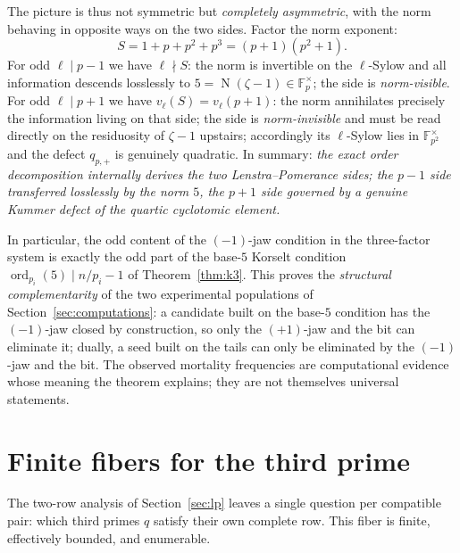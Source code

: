 \documentclass[11pt]{amsart}
\theoremstyle{definition}
\theoremstyle{remark}
\newcommand{\F}{\mathbb{F}}
\newcommand{\ord}{\operatorname{ord}}
\newcommand{\Norm}{\operatorname{N}}
\begin{document}
The picture is thus not symmetric but \emph{completely asymmetric}, with
the norm behaving in opposite ways on the two sides. Factor the norm
exponent:
\[
S = 1 + p + p^2 + p^3 = (p+1)(p^2+1).
\]
For odd $\ell \mid p-1$ we have $\ell \nmid S$: the norm is invertible on
the $\ell$-Sylow and all information descends losslessly to
$5 = \Norm(\zeta-1) \in \F_p^\times$; the side is \emph{norm-visible}.
For odd $\ell \mid p+1$ we have $v_\ell(S) = v_\ell(p+1)$: the norm
annihilates precisely the information living on that side; the side is
\emph{norm-invisible} and must be read directly on the residuosity of
$\zeta - 1$ upstairs; accordingly its $\ell$-Sylow lies in
$\F_{p^2}^\times$ and the defect $q_{p,+}$ is genuinely quadratic. In
summary: \emph{the exact order decomposition internally derives the two
Lenstra--Pomerance sides; the $p-1$ side transferred losslessly by the
norm $5$, the $p+1$ side governed by a genuine Kummer defect of the
quartic cyclotomic element.}

In particular, the odd content of the $(-1)$-jaw condition in the
three-factor system is exactly the odd part of the base-$5$ Korselt
condition $\ord_{p_i}(5) \mid n/p_i - 1$ of Theorem~\ref{thm:k3}. This
proves the \emph{structural complementarity} of the two experimental
populations of Section~\ref{sec:computations}: a candidate built on the
base-$5$ condition has the $(-1)$-jaw closed by construction, so only the
$(+1)$-jaw and the bit can eliminate it; dually, a seed built on the
tails can only be eliminated by the $(-1)$-jaw and the bit. The observed
mortality frequencies are computational evidence whose meaning the
theorem explains; they are not themselves universal statements.

\section{Finite fibers for the third prime}\label{sec:fibers}

The two-row analysis of Section~\ref{sec:lp} leaves a single question per
compatible pair: which third primes $q$ satisfy their own complete row.
This fiber is finite, effectively bounded, and enumerable.
\end{document}
